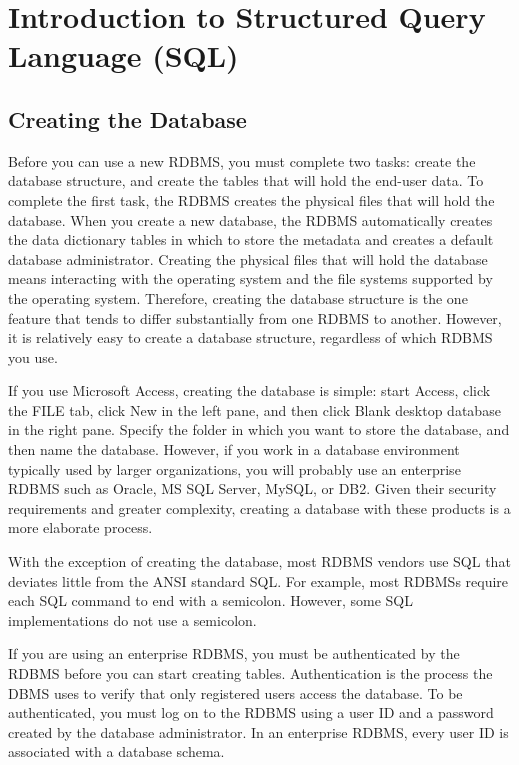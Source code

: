 \chapter{Introduction to Structured Query Language (SQL)}




\section{Creating the Database}


Before you can use a new RDBMS, you must complete two tasks: create the database structure, and create the tables
that will hold the end-user data. To complete the first task, the RDBMS creates the physical files that will hold the
database. When you create a new database, the RDBMS automatically creates the data dictionary tables in which to
store the metadata and creates a default database administrator. Creating the physical files that will hold the database
means interacting with the operating system and the file systems supported by the operating system. Therefore, creating
the database structure is the one feature that tends to differ substantially from one RDBMS to another. However, it
is relatively easy to create a database structure, regardless of which RDBMS you use.


If you use Microsoft Access, creating the database is simple: start Access, click the FILE tab, click New in the left pane,
and then click Blank desktop database in the right pane. Specify the folder in which you want to store the database, and
then name the database. However, if you work in a database environment typically used by larger organizations, you
will probably use an enterprise RDBMS such as Oracle, MS SQL Server, MySQL, or DB2. Given their security requirements
and greater complexity, creating a database with these products is a more elaborate process. 

With the exception of creating the database, most RDBMS vendors use SQL that deviates little from the ANSI standard
SQL. For example, most RDBMSs require each SQL command to end with a semicolon. However, some SQL
implementations do not use a semicolon. 


If you are using an enterprise RDBMS, you must be authenticated by the RDBMS before you can start creating tables.
Authentication is the process the DBMS uses to verify that only registered users access the database. To be authenticated,
you must log on to the RDBMS using a user ID and a password created by the database administrator. In an
enterprise RDBMS, every user ID is associated with a database schema.

